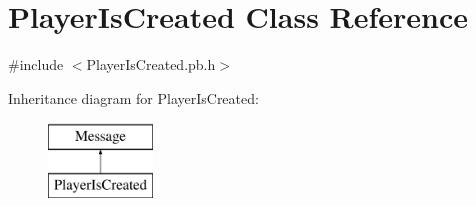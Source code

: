 \hypertarget{class_player_is_created}{\section{Player\-Is\-Created Class Reference}
\label{class_player_is_created}
}


{\ttfamily \#include $<$Player\-Is\-Created.\-pb.\-h$>$}

Inheritance diagram for Player\-Is\-Created\-:\begin{figure}[H]
\begin{center}
\leavevmode
\includegraphics[height=2.000000cm]{class_player_is_created}
\end{center}
\end{figure}
